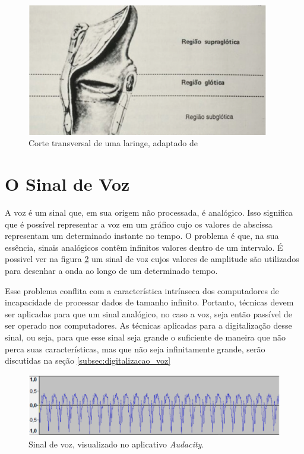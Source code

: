 \documentclass[a4paper,12pt,oneside]{report}
\begin{document}
\begin{figure}
\centering
\includegraphics[width=300pt]{laringe_basico.eps}
\caption{Corte transversal de uma laringe, adaptado de \cite{livro_laringe_henrique}}
\label{fig:laringe_basico}
\end{figure}
\section{O Sinal de Voz}
\label{sec:sinal_voz}
\hspace*{+15pt} A voz \'{e} um sinal que, em sua origem n\~{a}o processada, \'{e} anal\'{o}gico. Isso significa que \'{e} poss\'{i}vel representar a voz em um gr\'{a}fico cujo os valores de abscissa representam um determinado instante no tempo. O problema \'{e} que, na sua ess\^{e}ncia, sinais anal\'{o}gicos cont\^{e}m infinitos valores dentro de um intervalo. É possivel ver na figura \ref{fig:onda_voz} um sinal de voz cujos valores de amplitude s\~{a}o utilizados para desenhar a onda ao longo de um determinado tempo.
\\
\par Esse problema conflita com a caracter\'{i}stica intr\'{i}nseca dos computadores de incapacidade de processar dados de tamanho infinito. Portanto, t\'{e}cnicas devem ser aplicadas para que um sinal anal\'{o}gico, no caso a voz, seja ent\~{a}o pass\'{i}vel de ser operado nos computadores. As t\'{e}cnicas aplicadas para a digitaliza\c{c}\~{a}o desse sinal, ou seja, para que esse sinal seja grande o suficiente de maneira que n\~{a}o perca suas caracter\'{i}sticas, mas que n\~{a}o seja infinitamente grande, ser\~{a}o discutidas na se\c{c}\~{a}o \ref{subsec:digitalizacao_voz}
\begin{figure}
\centering
\includegraphics[width=350pt]{onda_voz}
\caption{Sinal de voz, visualizado no aplicativo \textit{Audacity}.}
\label{fig:onda_voz}
\end{figure}
\end{document}
